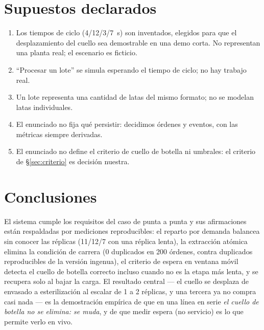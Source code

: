 \documentclass[12pt,a4paper]{article}
\begin{document}
\section{Supuestos declarados}
\label{sec:supuestos}

\begin{enumerate}[leftmargin=*]
  \item Los tiempos de ciclo (4/12/3/7~s) son inventados, elegidos para que el
        desplazamiento del cuello sea demostrable en una demo corta. No
        representan una planta real; el escenario es ficticio.
  \item ``Procesar un lote'' se simula esperando el tiempo de ciclo; no hay
        trabajo real.
  \item Un lote representa una cantidad de latas del mismo formato; no se
        modelan latas individuales.
  \item El enunciado no fija qué persistir: decidimos órdenes y eventos, con
        las métricas siempre derivadas.
  \item El enunciado no define el criterio de cuello de botella ni umbrales:
        el criterio de §\ref{sec:criterio} es decisión nuestra.
\end{enumerate}

\section{Conclusiones}

El sistema cumple los requisitos del caso de punta a punta y sus afirmaciones
están respaldadas por mediciones reproducibles: el reparto por demanda
balancea sin conocer las réplicas (11/12/7 con una réplica lenta), la
extracción atómica elimina la condición de carrera (0 duplicados en 200
órdenes, contra duplicados reproducibles de la versión ingenua), el criterio de
espera en ventana móvil detecta el cuello de botella correcto incluso cuando no
es la etapa más lenta, y se recupera solo al bajar la carga. El resultado
central — el cuello se desplaza de envasado a esterilización al escalar de 1 a
2 réplicas, y una tercera ya no compra casi nada — es la demostración empírica
de que en una línea en serie \emph{el cuello de botella no se elimina: se
muda}, y de que medir espera (no servicio) es lo que permite verlo en vivo.

\appendix
\end{document}
